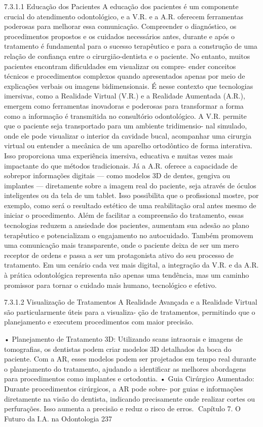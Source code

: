 7.3.1.1   Educação dos Pacientes
A educação dos pacientes é um componente crucial do atendimento odontológico, e
a V.R. e a A.R. oferecem ferramentas poderosas para melhorar essa comunicação.
Compreender o diagnóstico, os procedimentos propostos e os cuidados necessários
antes, durante e após o tratamento é fundamental para o sucesso terapêutico e para a
construção de uma relação de confiança entre o cirurgião-dentista e o paciente.
       No entanto, muitos pacientes encontram dificuldades em visualizar ou compre-
ender conceitos técnicos e procedimentos complexos quando apresentados apenas
por meio de explicações verbais ou imagens bidimensionais.
        É nesse contexto que tecnologias imersivas, como a Realidade Virtual (V.R.) e
a Realidade Aumentada (A.R.), emergem como ferramentas inovadoras e poderosas
para transformar a forma como a informação é transmitida no consultório odontológico.
         A V.R. permite que o paciente seja transportado para um ambiente tridimensio-
nal simulado, onde ele pode visualizar o interior da cavidade bucal, acompanhar uma
cirurgia virtual ou entender a mecânica de um aparelho ortodôntico de forma interativa.
Isso proporciona uma experiência imersiva, educativa e muitas vezes mais impactante
do que métodos tradicionais.
         Já a A.R. oferece a capacidade de sobrepor informações digitais — como
modelos 3D de dentes, gengiva ou implantes — diretamente sobre a imagem real do
paciente, seja através de óculos inteligentes ou da tela de um tablet. Isso possibilita que
o profissional mostre, por exemplo, como será o resultado estético de uma reabilitação
oral antes mesmo de iniciar o procedimento.
        Além de facilitar a compreensão do tratamento, essas tecnologias reduzem a
ansiedade dos pacientes, aumentam sua adesão ao plano terapêutico e potencializam o
engajamento no autocuidado. Também promovem uma comunicação mais transparente,
onde o paciente deixa de ser um mero receptor de ordens e passa a ser um protagonista
ativo do seu processo de tratamento.
        Em um cenário cada vez mais digital, a integração da V.R. e da A.R. à prática
odontológica representa não apenas uma tendência, mas um caminho promissor para
tornar o cuidado mais humano, tecnológico e efetivo.

7.3.1.2   Visualização de Tratamentos
A Realidade Avançada e a Realidade Virtual são particularmente úteis para a visualiza-
ção de tratamentos, permitindo que o planejamento e executem procedimentos com
maior precisão.

    • Planejamento de Tratamento 3D: Utilizando scans intraorais e imagens de
      tomografias, os dentistas podem criar modelos 3D detalhados da boca do paciente.
      Com a AR, esses modelos podem ser projetados em tempo real durante o
      planejamento do tratamento, ajudando a identificar as melhores abordagens para
      procedimentos como implantes e ortodontia.
    • Guia Cirúrgico Aumentado: Durante procedimentos cirúrgicos, a AR pode sobre-
      por guias e informações diretamente na visão do dentista, indicando precisamente
      onde realizar cortes ou perfurações. Isso aumenta a precisão e reduz o risco de
      erros.
Capítulo 7. O Futuro da I.A. na Odontologia                                         237


